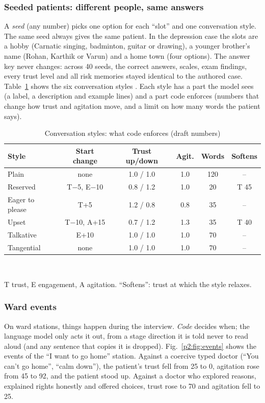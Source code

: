 \documentclass[10pt]{article}
\begin{document}
\subsubsection{Seeded patients: different people, same answers}
A \emph{seed} (any number) picks one option for each ``slot'' and one conversation style. The same seed always gives the same patient. In the
depression case the slots are a hobby (Carnatic singing, badminton, guitar or drawing), a younger brother's name (Rohan, Karthik or Varun) and a home
town (four options). The answer key never changes: across 40 seeds, the correct answers, scales, exam findings, every trust level and all risk
memories stayed identical to the authored case. Table~\ref{p2:tab:styles} shows the six conversation styles \cite{wang2024patient}. Each style has a
part the model sees (a label, a description and example lines) and a part code enforces (numbers that change how trust and agitation move, and a
limit on how many words the patient says).

\begin{table}[htbp]
\caption{Conversation styles: what code enforces (draft numbers)}
\label{p2:tab:styles}
\centering
\scriptsize
\begin{tabular}{@{}lccccc@{}}
\toprule
Style & Start change & Trust up/down & Agit. & Words & Softens\\
\midrule
Plain & none & 1.0 / 1.0 & 1.0 & 120 & --\\
Reserved & T$-$5, E$-$10 & 0.8 / 1.2 & 1.0 & 20 & T 45\\
Eager to please & T+5 & 1.2 / 0.8 & 0.8 & 35 & --\\
Upset & T$-$10, A+15 & 0.7 / 1.2 & 1.3 & 35 & T 40\\
Talkative & E+10 & 1.0 / 1.0 & 1.0 & 70 & --\\
Tangential & none & 1.0 / 1.0 & 1.0 & 70 & --\\
\bottomrule
\end{tabular}
\\[1mm]\raggedright\scriptsize T trust, E engagement, A agitation. ``Softens'': trust at which the style relaxes.
\end{table}

\subsubsection{Ward events}
On ward stations, things happen during the interview. \emph{Code} decides when; the language model only acts it out, from a stage direction it is
told never to read aloud (and any sentence that copies it is dropped). Fig.~\ref{p2:fig:events} shows the events of the ``I want to go home''
station. Against a coercive typed doctor (``You can't go home'', ``calm down''), the patient's trust fell from 25 to 0, agitation rose from 45 to 92, and the patient stood up. Against a doctor who explored reasons, explained rights honestly and offered choices, trust rose to 70 and agitation fell to 25.
\end{document}
